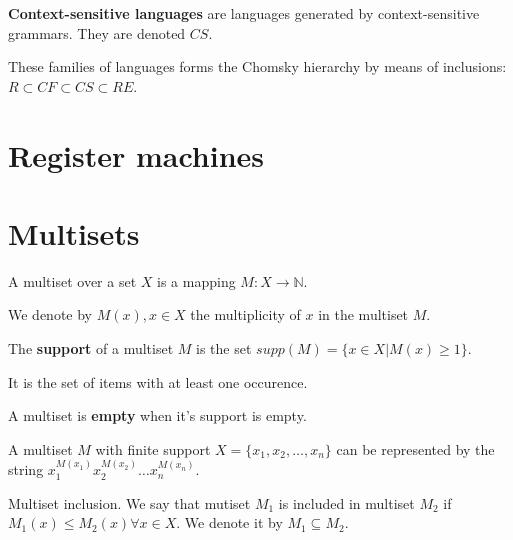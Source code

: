 \begin{definition}
{\bf Context-sensitive languages} are languages generated by context-sensitive grammars. They are denoted $CS$.
\end{definition}

These families of languages forms the Chomsky hierarchy by means of inclusions: $R \subset CF \subset CS \subset RE$.


\section{Register machines} %
\label{sec:register_machines}





\section{Multisets} %
\label{sec:multisets}

\begin{definition}
A multiset over a set $X$ is a mapping $M: X\rightarrow \mathbb N$.
\end{definition}

We denote by $M(x), x\in X$ the multiplicity of $x$ in the multiset $M$.

\begin{definition}
The {\bf support} of a multiset $M$ is the set $supp(M)=\{x\in X|M(x)\geq 1\}$.
\end{definition}

It is the set of items with at least one occurence.

\begin{definition}
A multiset is {\bf empty} when it's support is empty.
\end{definition}

A multiset $M$ with finite support $X = \{x_1, x_2, \dots, x_n\}$ can be represented by the string $x_1^{M(x_1)}x_2^{M(x_2)}\dots x_n^{M(x_n)}$.

\begin{definition}
Multiset inclusion. We say that mutiset $M_1$ is included in multiset $M_2$ if $M_1(x)\leq M_2(x)\forall x \in X$. We denote it by $M_1\subseteq M_2$.
\end{definition}

